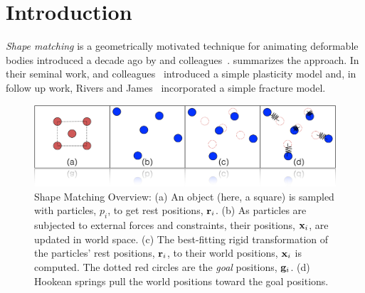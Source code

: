 \documentclass[conference]{acmsiggraph}
\begin{document}
\keywordlist

\conceptlist

\printcopyright


\copyrightspace

\section{Introduction}\label{sec:Introduction}
{\em Shape matching} is a geometrically motivated technique for animating deformable bodies introduced
a decade ago by \Mueller and colleagues~.
 summarizes the approach.
In their seminal work, \Mueller and colleagues~ introduced a simple plasticity
model and, in follow up work, Rivers and James~
incorporated a simple fracture model.  

\begin{figure}
\includegraphics[width=\linewidth]{Figures/shapematching.png}
\caption{Shape Matching Overview: (a) An object (here, a square) is sampled with particles, $p_i$, to get rest positions, $\mathit{\mathbf{r}}_i$.  
(b) As particles are subjected to external forces and constraints, their positions, $\mathit{\mathbf{x}}_i$, are updated in world space.  
(c)  The best-fitting rigid transformation of the particles' rest positions, $\mathit{\mathbf{r}}_i$, 
to their world positions, $\mathit{\mathbf{x}}_i$ is computed.  The dotted red circles are the {\em goal} positions, $\mathit{\mathbf{g}}_i$.  
(d) Hookean springs pull the world positions toward the goal positions.}
\label{fig:shapematching}
\end{figure}
\end{document}
